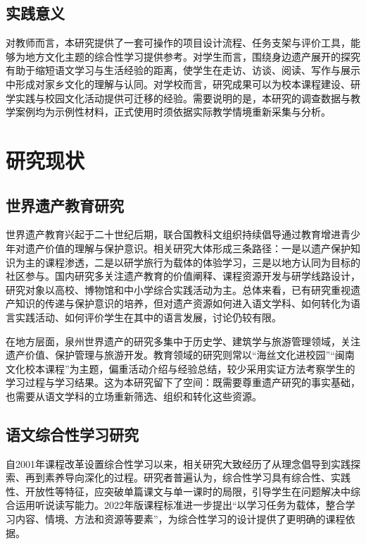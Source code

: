 \subsection{实践意义}

对教师而言，本研究提供了一套可操作的项目设计流程、任务支架与评价工具，能够为地方文化主题的综合性学习提供参考。对学生而言，围绕身边遗产展开的探究有助于缩短语文学习与生活经验的距离，使学生在走访、访谈、阅读、写作与展示中形成对家乡文化的理解与认同。对学校而言，研究成果可以为校本课程建设、研学实践与校园文化活动提供可迁移的经验。需要说明的是，本研究的调查数据与教学案例均为示例性材料，正式使用时须依据实际教学情境重新采集与分析。

\section{研究现状}

\subsection{世界遗产教育研究}

世界遗产教育兴起于二十世纪后期，联合国教科文组织持续倡导通过教育增进青少年对遗产价值的理解与保护意识\cite{unesco2012}。相关研究大体形成三条路径：一是以遗产保护知识为主的课程渗透，二是以研学旅行为载体的体验学习，三是以地方认同为目标的社区参与。国内研究多关注遗产教育的价值阐释、课程资源开发与研学线路设计，研究对象以高校、博物馆和中小学综合实践活动为主\cite{shanjixiang2009}。总体来看，已有研究重视遗产知识的传递与保护意识的培养，但对遗产资源如何进入语文学科、如何转化为语言实践活动、如何评价学生在其中的语言发展，讨论仍较有限。

在地方层面，泉州世界遗产的研究多集中于历史学、建筑学与旅游管理领域，关注遗产价值、保护管理与旅游开发。教育领域的研究则常以“海丝文化进校园”“闽南文化校本课程”为主题，偏重活动介绍与经验总结，较少采用实证方法考察学生的学习过程与学习结果。这为本研究留下了空间：既需要尊重遗产研究的事实基础，也需要从语文学科的立场重新筛选、组织和转化这些资源。

\subsection{语文综合性学习研究}

自2001年课程改革设置综合性学习以来，相关研究大致经历了从理念倡导到实践探索、再到素养导向深化的过程。研究者普遍认为，综合性学习具有综合性、实践性、开放性等特征，应突破单篇课文与单一课时的局限，引导学生在问题解决中综合运用听说读写能力\cite{wangrongsheng2003}。2022年版课程标准进一步提出“以学习任务为载体，整合学习内容、情境、方法和资源等要素”，为综合性学习的设计提供了更明确的课程依据\cite{jiaoyubu2022}。

